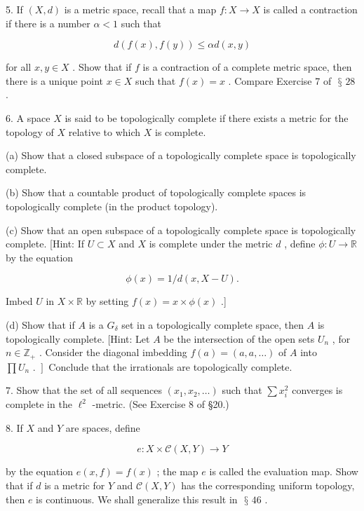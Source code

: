 \documentclass[10pt]{article}
\begin{document}
5. If \(\left( {X,d}\right)\) is a metric space, recall that a map \(f : X \rightarrow  X\) is called a contraction if there is a number \(\alpha  < 1\) such that

\[
d\left( {f\left( x\right) ,f\left( y\right) }\right)  \leq  {\alpha d}\left( {x,y}\right)
\]

for all \(x,y \in  X\) . Show that if \(f\) is a contraction of a complete metric space, then there is a unique point \(x \in  X\) such that \(f\left( x\right)  = x\) . Compare Exercise 7 of \(\text{ § }{28}\) .

6. A space \(X\) is said to be topologically complete if there exists a metric for the topology of \(X\) relative to which \(X\) is complete.

(a) Show that a closed subspace of a topologically complete space is topologically complete.

(b) Show that a countable product of topologically complete spaces is topologically complete (in the product topology).

(c) Show that an open subspace of a topologically complete space is topologically complete. [Hint: If \(U \subset  X\) and \(X\) is complete under the metric \(d\) , define \(\phi  : U \rightarrow  \mathbb{R}\) by the equation

\[
\phi \left( x\right)  = 1/d\left( {x,X - U}\right) .
\]

Imbed \(U\) in \(X \times  \mathbb{R}\) by setting \(f\left( x\right)  = x \times  \phi \left( x\right)\) .]

(d) Show that if \(A\) is a \({G}_{\delta }\) set in a topologically complete space, then \(A\) is topologically complete. [Hint: Let \(A\) be the intersection of the open sets \({U}_{n}\) , for \(n \in  {\mathbb{Z}}_{ + }\) . Consider the diagonal imbedding \(f\left( a\right)  = \left( {a,a,\ldots }\right)\) of \(A\) into \(\left. {\prod {U}_{n}\text{ . }}\right\rbrack\) Conclude that the irrationals are topologically complete.

7. Show that the set of all sequences \(\left( {{x}_{1},{x}_{2},\ldots }\right)\) such that \(\sum {x}_{i}^{2}\) converges is complete in the \({\ell }^{2}\) -metric. (See Exercise 8 of §20.)

8. If \(X\) and \(Y\) are spaces, define

\[
e : X \times  \mathcal{C}\left( {X,Y}\right)  \rightarrow  Y
\]

by the equation \(e\left( {x,f}\right)  = f\left( x\right)\) ; the map \(e\) is called the evaluation map. Show that if \(d\) is a metric for \(Y\) and \(\mathcal{C}\left( {X,Y}\right)\) has the corresponding uniform topology, then \(e\) is continuous. We shall generalize this result in \(\text{ § }{46}\) .
\end{document}
